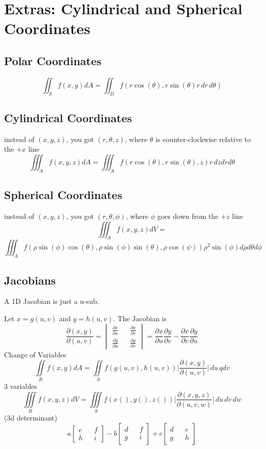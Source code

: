\documentclass{report}
\newcommand{\p}{\partial}
\newcommand{\pdif}[2]{ \frac{\partial #1}{ \partial #2} }
\begin{document}
\chapter{Extras: Cylindrical and Spherical Coordinates}
\section{Polar Coordinates}
$$
\iint_S f(x, y) dA = \iint_D f(r\cos(\theta), r\sin(\theta) r \,dr \, d\theta)
$$
\section{Cylindrical Coordinates}
instead of $(x, y, z)$, you got $(r, \theta, z)$, where $\theta$ is counter-clockwise relative to the $+x$ line
$$
\iiint_A f(x, y, z) dA = \iiint_A f(r\cos(\theta), r\sin(\theta), z) r \,dz dr d\theta
$$

\section{Spherical Coordinates}
instead of $(x, y, z)$, you got $(r, \theta, \phi)$, where $\phi$ goes down from the $+z$ line
$$
\iiint_A f(x, y, z)dV = 
$$
$$
\iiint_A f(\rho \sin(\phi) \cos(\theta), \rho \sin(\phi) \sin(\theta), \rho \cos(\psi)) \rho^2 \sin(\phi)
d\rho d\theta d\phi
$$


\section{Jacobians}
A 1D Jacobian is just a u-sub.

Let $x = g(u, v)$ and $y = h(u, v)$. The Jacobian is
$$
\frac{\p (x, y)}{\p (u, v)} =
\begin{vmatrix} 
\pdif{x}{u} && \pdif{x}{v} \\
\pdif{y}{u} && \pdif{y}{v}
\end{vmatrix}
=
\pdif{x}{u} \pdif{y}{v} - \pdif{x}{v} \pdif{y}{u} 
$$
Change of Variables
$$
\iint \limits_R f(x, y) dA = \iint \limits_S f(g(u, v), h(u, v))
\bigg| \frac{\p (x, y)}{\p (u, v)} \bigg| \,du \,	q	dv
$$
3 variables
$$
\iiint \limits_R f(x, y, z) dV = \iiint \limits_S f(x(), y(), z()) \bigg| \frac{\p (x, y, z)}{\p (u, v, w)} \bigg| \,du \,dv \,dw
$$
(3d determinant)
$$
a\begin{bmatrix}e && f \\ h && i \end{bmatrix} -
b\begin{bmatrix}d && f \\ g && i \end{bmatrix} +
c\begin{bmatrix}d && e \\ g && h \end{bmatrix}
$$
\end{document}
